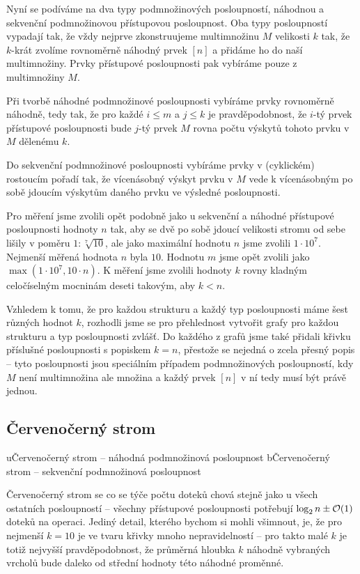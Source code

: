 Nyní se podíváme na dva typy podmnožinových posloupností, náhodnou a sekvenční
podmnožinovou přístupovou posloupnost. Oba typy posloupností vypadají tak, že
vždy nejprve zkonstruujeme multimnožinu $M$ velikosti $k$ tak, že $k$-krát
zvolíme rovnoměrně náhodný prvek $[n]$ a přidáme ho do naší multimnožiny. Prvky
přístupové posloupnosti pak vybíráme pouze z multimnožiny $M$. 

Při tvorbě
náhodné podmnožinové posloupnosti vybíráme prvky rovnoměrně náhodně, tedy tak, že pro každé
$i\leq m$ a $j\leq k$ je pravděpodobnost, že $i$-tý prvek přístupové
posloupnosti bude $j$-tý prvek $M$ rovna počtu výskytů tohoto prvku v $M$
dělenému $k$.

Do sekvenční podmnožinové posloupnosti vybíráme prvky v (cyklickém) rostoucím pořadí tak, že vícenásobný výskyt prvku v $M$ vede k vícenásobným po sobě jdoucím výskytům daného prvku ve výsledné posloupnosti. 

Pro měření jsme zvolili opět podobně jako u sekvenční a náhodné přístupové
posloupnosti hodnoty $n$ tak, aby se dvě po sobě jdoucí velikosti stromu od
sebe lišily v poměru $1:\sqrt[7]{10}$, ale jako maximální hodnotu $n$ jsme
zvolili $1\cdot10^7$. Nejmenší měřená hodnota $n$ byla $10$. Hodnotu $m$ jsme
opět zvolili jako $\max(1\cdot10^7, 10\cdot n)$. K měření jsme zvolili hodnoty
$k$ rovny kladným celočíselným mocninám deseti takovým, aby $k<n$.

Vzhledem k tomu, že pro každou strukturu a každý typ posloupnosti máme šest
různých hodnot $k$, rozhodli jsme se pro přehlednost vytvořit grafy pro každou
strukturu a typ posloupnosti zvlášť. Do každého z grafů jsme také přidali
křivku příslušné  posloupnosti s popiskem $k=n$, přestože se
nejedná o zcela přesný popis -- tyto posloupnosti jsou speciálním případem
podmnožinových posloupností, kdy $M$ není multimnožina ale množina a každý
prvek $[n]$ v ní tedy musí být právě jednou.

\subsection{Červenočerný strom}

u{Červenočerný strom -- náhodná podmnožinová posloupnost}
b{Červenočerný strom -- sekvenční podmnožinová posloupnost}

Červenočerný strom se co se týče počtu doteků chová stejně jako u všech
ostatních posloupností -- všechny přístupové posloupnosti potřebují $\log n \pm
\o(1)$ doteků na operaci. Jediný detail, kterého bychom si mohli všimnout, je,
že pro nejmenší $k=10$ je ve tvaru křivky mnoho nepravidelností -- pro takto
malé $k$ je totiž nejvyšší pravděpodobnost, že průměrná hloubka $k$ náhodně
vybraných vrcholů bude daleko od střední hodnoty této náhodné proměnné. 

